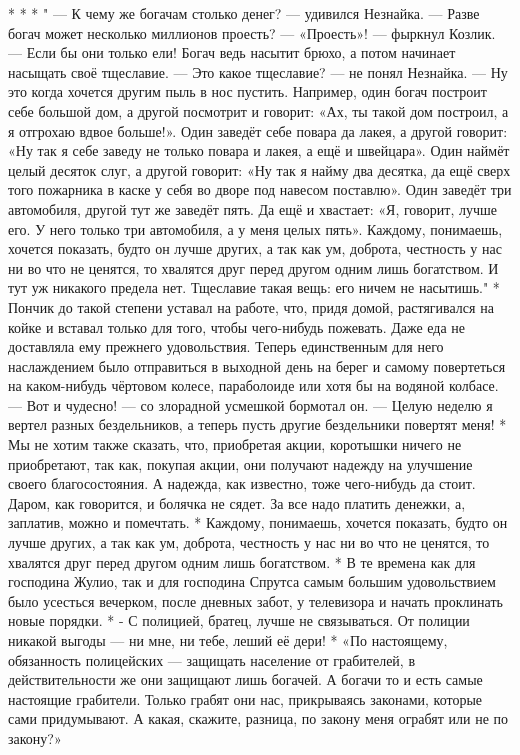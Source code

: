 * * *
" --- К чему же богачам столько денег? --- удивился Незнайка. --- Разве богач
может несколько миллионов проесть? --- «Проесть»! --- фыркнул Козлик. --- Если бы
они только ели! Богач ведь насытит брюхо, а потом начинает насыщать своё
тщеславие. --- Это какое тщеславие? --- не понял Незнайка. --- Ну это когда
хочется другим пыль в нос пустить. Например, один богач построит себе
большой дом, а другой посмотрит и говорит: «Ах, ты такой дом построил, а я
отгрохаю вдвое больше!». Один заведёт себе повара да лакея, а другой
говорит: «Ну так я себе заведу не только повара и лакея, а ещё и швейцара».
Один наймёт целый десяток слуг, а другой говорит: «Ну так я найму два
десятка, да ещё сверх того пожарника в каске у себя во дворе под навесом
поставлю». Один заведёт три автомобиля, другой тут же заведёт пять. Да ещё и
хвастает: «Я, говорит, лучше его. У него только три автомобиля, а у меня
целых пять». Каждому, понимаешь, хочется показать, будто он лучше других, а
так как ум, доброта, честность у нас ни во что не ценятся, то хвалятся друг
перед другом одним лишь богатством. И тут уж никакого предела нет. Тщеславие
такая вещь: его ничем не насытишь."
* 
Пончик до такой степени уставал на работе, что, придя домой, растягивался на койке и вставал только для того, чтобы чего-нибудь пожевать. Даже еда не доставляла ему прежнего удовольствия. Теперь единственным для него наслаждением было отправиться в выходной день на берег и самому повертеться на каком-нибудь чёртовом колесе, параболоиде или хотя бы на водяной колбасе. --- Вот и чудесно! --- со злорадной усмешкой бормотал он. --- Целую неделю я вертел разных бездельников, а теперь пусть другие бездельники повертят меня! 
*
Мы не хотим также сказать, что, приобретая акции, коротышки ничего не приобретают, так как, покупая акции, они получают надежду на улучшение своего благосостояния. А надежда, как известно, тоже чего-нибудь да стоит. Даром, как говорится, и болячка не сядет. За все надо платить денежки, а, заплатив, можно и помечтать. 
*
Каждому, понимаешь, хочется показать, будто он лучше других, а так как ум, доброта, честность у нас ни во что не ценятся, то хвалятся друг перед другом одним лишь богатством. 
*
В те времена как для господина Жулио, так и для господина Спрутса самым большим удовольствием было усесться вечерком, после дневных забот, у телевизора и начать проклинать новые порядки. 
*
- С полицией, братец, лучше не связываться. От полиции никакой выгоды --- ни мне, ни тебе, леший её дери! 
*
«По настоящему, обязанность полицейских --- защищать население от грабителей, в действительности же они защищают лишь богачей. А богачи то и есть самые настоящие грабители. Только грабят они нас, прикрываясь законами, которые сами придумывают. А какая, скажите, разница, по закону меня ограбят или не по закону?» 
